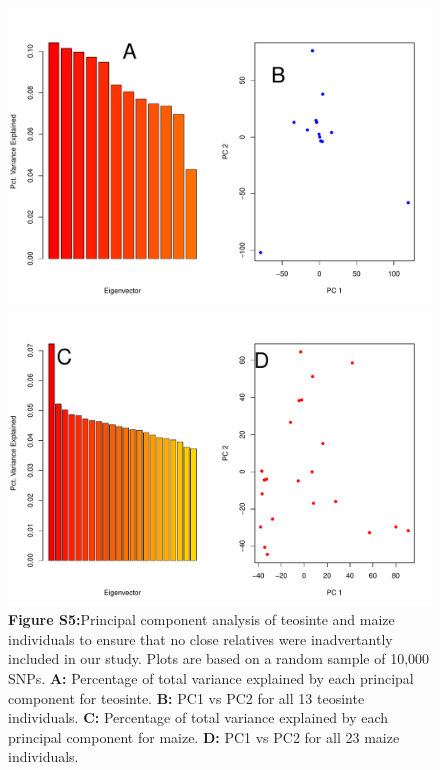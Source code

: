 \documentclass{article}
\begin{document}
\begin{figure}[h!]
  \includegraphics[width=.8\textwidth]{FigsAndFiles/tilPCA_july.pdf}\\
    \includegraphics[width=.8\textwidth]{FigsAndFiles/bknPCA_july}\\
{\bf Figure S5:}Principal component analysis of teosinte and maize individuals to ensure that no close relatives were inadvertantly included in our study. Plots are based on a random sample of 10,000 SNPs. {\bf A:} Percentage of total variance explained by each principal component for teosinte. {\bf B:} PC1 vs PC2 for all 13 teosinte individuals. {\bf C:} Percentage of total variance explained by each principal component for maize. {\bf D:} PC1 vs PC2 for all 23 maize individuals.
\end{figure}
\end{document}
